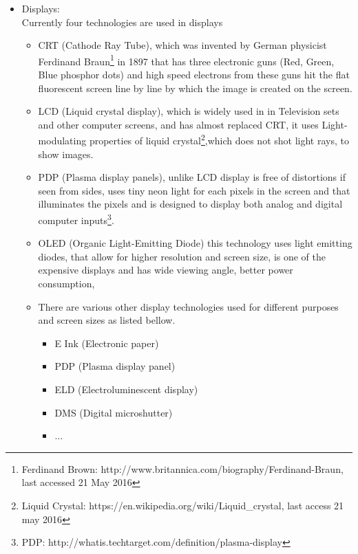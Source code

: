 \begin{itemize}

\item Displays: \\
Currently four technologies are used in displays 

\begin{itemize}
\item CRT (Cathode Ray Tube), which was invented by German physicist Ferdinand Braun\footnote{Ferdinand Brown: 
http://www.britannica.com/biography/Ferdinand-Braun, last accessed 21 May 2016} in 1897 that has three electronic guns (Red, Green, Blue phosphor dots) and high speed electrons  from these guns hit the flat fluorescent screen line by line by which the image is created on the screen.  

\item LCD (Liquid crystal display), which is widely used in in Television sets and other computer screens, and has almost replaced CRT, it uses Light-modulating properties of liquid crystal\footnote{Liquid Crystal: https://en.wikipedia.org/wiki/Liquid\_crystal, last access 21 may 2016},which does not shot light rays, to show images. 

\item PDP (Plasma display panels), unlike LCD display is free of distortions if seen from sides, uses tiny neon light for each pixels in the screen and that illuminates the pixels and is designed to display both analog and digital computer inputs\footnote{PDP: http://whatis.techtarget.com/definition/plasma-display}.

\item OLED (Organic Light-Emitting Diode) this technology uses light emitting diodes, that allow for higher resolution and screen size, is one of the expensive displays and has wide viewing angle, better power consumption,


\item There are various other display technologies used for different purposes and screen sizes as listed bellow.

\begin{itemize}
\item E Ink (Electronic paper)
\item PDP (Plasma display panel)
\item ELD (Electroluminescent display)
\item DMS (Digital microshutter)
\item ...

\end{itemize}


\end{itemize}
\end{itemize}
